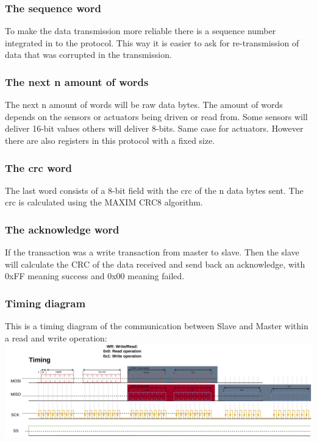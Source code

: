 \subsubsection{The sequence word}
To make the data transmission more reliable there is a sequence number integrated in to the protocol. This way it is easier to ask for re-transmission of data that was corrupted in the transmission.

\subsubsection{The next n amount of words}
The next n amount of words will be raw data bytes. The amount of words depends on the sensors or actuators being driven or read from. Some sensors will deliver 16-bit values others will deliver 8-bits. Same case for actuators. However there are also registers in this protocol with a fixed size.

\subsubsection{The crc word}
The last word consists of a 8-bit field with the crc of the n data bytes sent. The crc is calculated using the MAXIM CRC8 algorithm.

\subsubsection{The acknowledge word}
If the transaction was a write transaction from master to slave. Then the slave will calculate the CRC of the data received and send back an acknowledge, with 0xFF meaning success and 0x00 meaning failed.

\pagebreak
\subsubsection{Timing diagram}
This is a timing diagram of the communication between Slave and Master within a read and write operation:\\
\includegraphics[scale=0.06]{figures/mainboard_communication_timing_diagram.jpg}
\pagebreak
